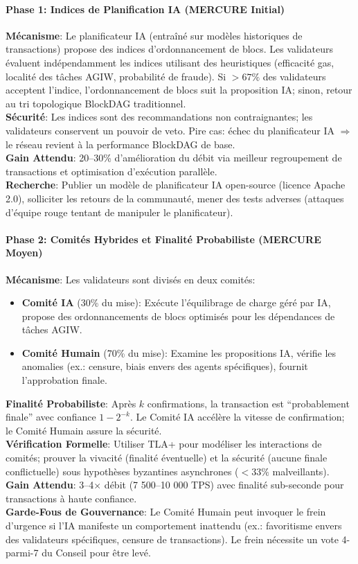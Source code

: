\documentclass[11pt]{article}
\begin{document}
\paragraph{Phase 1: Indices de Planification IA (MERCURE Initial)}
\textbf{Mécanisme}: Le planificateur IA (entraîné sur modèles historiques de transactions) propose des indices d'ordonnancement de blocs. Les validateurs évaluent indépendamment les indices utilisant des heuristiques (efficacité gas, localité des tâches AGIW, probabilité de fraude). Si $>67\%$ des validateurs acceptent l'indice, l'ordonnancement de blocs suit la proposition IA; sinon, retour au tri topologique BlockDAG traditionnel.\\
\textbf{Sécurité}: Les indices sont des recommandations non contraignantes; les validateurs conservent un pouvoir de veto. Pire cas: échec du planificateur IA $\Rightarrow$ le réseau revient à la performance BlockDAG de base.\\
\textbf{Gain Attendu}: 20--30\% d'amélioration du débit via meilleur regroupement de transactions et optimisation d'exécution parallèle.\\
\textbf{Recherche}: Publier un modèle de planificateur IA open-source (licence Apache 2.0), solliciter les retours de la communauté, mener des tests adverses (attaques d'équipe rouge tentant de manipuler le planificateur).

\paragraph{Phase 2: Comités Hybrides et Finalité Probabiliste (MERCURE Moyen)}
\textbf{Mécanisme}: Les validateurs sont divisés en deux comités:
\begin{itemize}[noitemsep]
  \item \textbf{Comité IA} (30\% du mise): Exécute l'équilibrage de charge géré par IA, propose des ordonnancements de blocs optimisés pour les dépendances de tâches AGIW.
  \item \textbf{Comité Humain} (70\% du mise): Examine les propositions IA, vérifie les anomalies (ex.: censure, biais envers des agents spécifiques), fournit l'approbation finale.
\end{itemize}
\textbf{Finalité Probabiliste}: Après $k$ confirmations, la transaction est ``probablement finale'' avec confiance $1 - 2^{-k}$. Le Comité IA accélère la vitesse de confirmation; le Comité Humain assure la sécurité.\\
\textbf{Vérification Formelle}: Utiliser TLA+ pour modéliser les interactions de comités; prouver la vivacité (finalité éventuelle) et la sécurité (aucune finale conflictuelle) sous hypothèses byzantines asynchrones ($<33\%$ malveillants).\\
\textbf{Gain Attendu}: 3--4$\times$ débit (7 500--10 000 TPS) avec finalité sub-seconde pour transactions à haute confiance.\\
\textbf{Garde-Fous de Gouvernance}: Le Comité Humain peut invoquer le frein d'urgence si l'IA manifeste un comportement inattendu (ex.: favoritisme envers des validateurs spécifiques, censure de transactions). Le frein nécessite un vote 4-parmi-7 du Conseil pour être levé.
\end{document}
